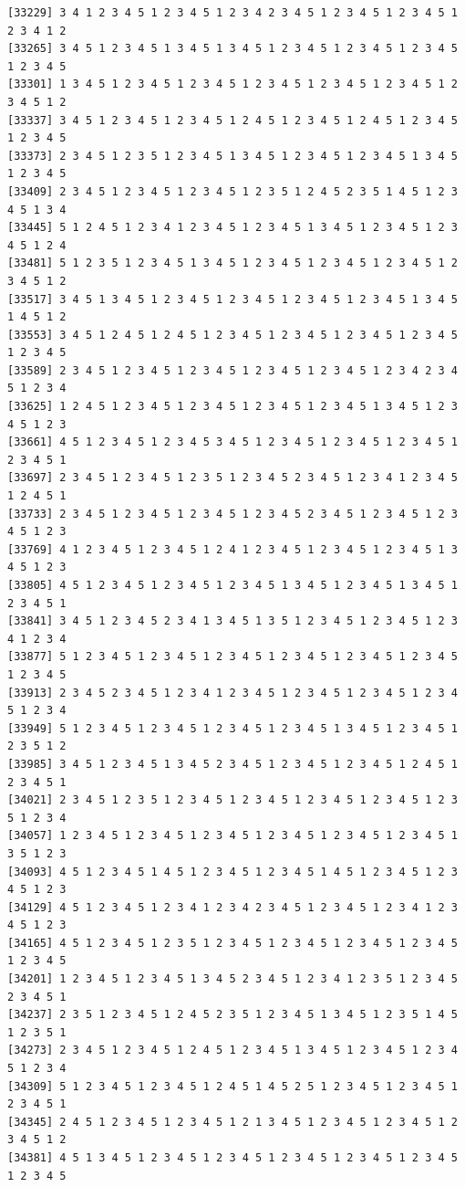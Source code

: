 \documentclass[
  11pt,
]{book}
\begin{document}
\begin{verbatim}
[33229] 3 4 1 2 3 4 5 1 2 3 4 5 1 2 3 4 2 3 4 5 1 2 3 4 5 1 2 3 4 5 1 2 3 4 1 2
[33265] 3 4 5 1 2 3 4 5 1 3 4 5 1 3 4 5 1 2 3 4 5 1 2 3 4 5 1 2 3 4 5 1 2 3 4 5
[33301] 1 3 4 5 1 2 3 4 5 1 2 3 4 5 1 2 3 4 5 1 2 3 4 5 1 2 3 4 5 1 2 3 4 5 1 2
[33337] 3 4 5 1 2 3 4 5 1 2 3 4 5 1 2 4 5 1 2 3 4 5 1 2 4 5 1 2 3 4 5 1 2 3 4 5
[33373] 2 3 4 5 1 2 3 5 1 2 3 4 5 1 3 4 5 1 2 3 4 5 1 2 3 4 5 1 3 4 5 1 2 3 4 5
[33409] 2 3 4 5 1 2 3 4 5 1 2 3 4 5 1 2 3 5 1 2 4 5 2 3 5 1 4 5 1 2 3 4 5 1 3 4
[33445] 5 1 2 4 5 1 2 3 4 1 2 3 4 5 1 2 3 4 5 1 3 4 5 1 2 3 4 5 1 2 3 4 5 1 2 4
[33481] 5 1 2 3 5 1 2 3 4 5 1 3 4 5 1 2 3 4 5 1 2 3 4 5 1 2 3 4 5 1 2 3 4 5 1 2
[33517] 3 4 5 1 3 4 5 1 2 3 4 5 1 2 3 4 5 1 2 3 4 5 1 2 3 4 5 1 3 4 5 1 4 5 1 2
[33553] 3 4 5 1 2 4 5 1 2 4 5 1 2 3 4 5 1 2 3 4 5 1 2 3 4 5 1 2 3 4 5 1 2 3 4 5
[33589] 2 3 4 5 1 2 3 4 5 1 2 3 4 5 1 2 3 4 5 1 2 3 4 5 1 2 3 4 2 3 4 5 1 2 3 4
[33625] 1 2 4 5 1 2 3 4 5 1 2 3 4 5 1 2 3 4 5 1 2 3 4 5 1 3 4 5 1 2 3 4 5 1 2 3
[33661] 4 5 1 2 3 4 5 1 2 3 4 5 3 4 5 1 2 3 4 5 1 2 3 4 5 1 2 3 4 5 1 2 3 4 5 1
[33697] 2 3 4 5 1 2 3 4 5 1 2 3 5 1 2 3 4 5 2 3 4 5 1 2 3 4 1 2 3 4 5 1 2 4 5 1
[33733] 2 3 4 5 1 2 3 4 5 1 2 3 4 5 1 2 3 4 5 2 3 4 5 1 2 3 4 5 1 2 3 4 5 1 2 3
[33769] 4 1 2 3 4 5 1 2 3 4 5 1 2 4 1 2 3 4 5 1 2 3 4 5 1 2 3 4 5 1 3 4 5 1 2 3
[33805] 4 5 1 2 3 4 5 1 2 3 4 5 1 2 3 4 5 1 3 4 5 1 2 3 4 5 1 3 4 5 1 2 3 4 5 1
[33841] 3 4 5 1 2 3 4 5 2 3 4 1 3 4 5 1 3 5 1 2 3 4 5 1 2 3 4 5 1 2 3 4 1 2 3 4
[33877] 5 1 2 3 4 5 1 2 3 4 5 1 2 3 4 5 1 2 3 4 5 1 2 3 4 5 1 2 3 4 5 1 2 3 4 5
[33913] 2 3 4 5 2 3 4 5 1 2 3 4 1 2 3 4 5 1 2 3 4 5 1 2 3 4 5 1 2 3 4 5 1 2 3 4
[33949] 5 1 2 3 4 5 1 2 3 4 5 1 2 3 4 5 1 2 3 4 5 1 3 4 5 1 2 3 4 5 1 2 3 5 1 2
[33985] 3 4 5 1 2 3 4 5 1 3 4 5 2 3 4 5 1 2 3 4 5 1 2 3 4 5 1 2 4 5 1 2 3 4 5 1
[34021] 2 3 4 5 1 2 3 5 1 2 3 4 5 1 2 3 4 5 1 2 3 4 5 1 2 3 4 5 1 2 3 5 1 2 3 4
[34057] 1 2 3 4 5 1 2 3 4 5 1 2 3 4 5 1 2 3 4 5 1 2 3 4 5 1 2 3 4 5 1 3 5 1 2 3
[34093] 4 5 1 2 3 4 5 1 4 5 1 2 3 4 5 1 2 3 4 5 1 4 5 1 2 3 4 5 1 2 3 4 5 1 2 3
[34129] 4 5 1 2 3 4 5 1 2 3 4 1 2 3 4 2 3 4 5 1 2 3 4 5 1 2 3 4 1 2 3 4 5 1 2 3
[34165] 4 5 1 2 3 4 5 1 2 3 5 1 2 3 4 5 1 2 3 4 5 1 2 3 4 5 1 2 3 4 5 1 2 3 4 5
[34201] 1 2 3 4 5 1 2 3 4 5 1 3 4 5 2 3 4 5 1 2 3 4 1 2 3 5 1 2 3 4 5 2 3 4 5 1
[34237] 2 3 5 1 2 3 4 5 1 2 4 5 2 3 5 1 2 3 4 5 1 3 4 5 1 2 3 5 1 4 5 1 2 3 5 1
[34273] 2 3 4 5 1 2 3 4 5 1 2 4 5 1 2 3 4 5 1 3 4 5 1 2 3 4 5 1 2 3 4 5 1 2 3 4
[34309] 5 1 2 3 4 5 1 2 3 4 5 1 2 4 5 1 4 5 2 5 1 2 3 4 5 1 2 3 4 5 1 2 3 4 5 1
[34345] 2 4 5 1 2 3 4 5 1 2 3 4 5 1 2 1 3 4 5 1 2 3 4 5 1 2 3 4 5 1 2 3 4 5 1 2
[34381] 4 5 1 3 4 5 1 2 3 4 5 1 2 3 4 5 1 2 3 4 5 1 2 3 4 5 1 2 3 4 5 1 2 3 4 5

\end{verbatim}
\end{document}
